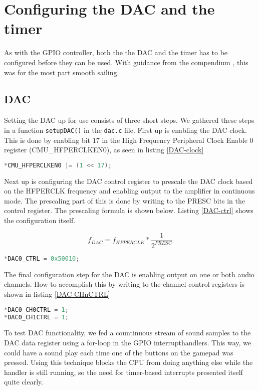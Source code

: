 \section{Configuring the DAC and the timer}

As with the GPIO controller, both the the DAC and the timer has to be configured before they can be used. With guidance from the compendium \cite{compendium}, this was for the most part smooth sailing.

\subsection{DAC}

Setting the DAC up for use consists of three short steps. We gathered these steps in a function \texttt{setupDAC()} in the \texttt{dac.c} file. First up is enabling the DAC clock. This is done by enabling bit $17$ in the High Frequency Peripheral Clock Enable 0 register (CMU\_HFPERCLKEN0), as seen in listing \ref{DAC-clock}

\begin{lstlisting}[language=C, label=DAC-clock, caption=Enabling DAC clock]
*CMU_HFPERCLKEN0 |= (1 << 17);
\end{lstlisting}

Next up is configuring the DAC control register to prescale the DAC clock based on the HFPERCLK frequency and enabling output to the amplifier in continuous mode. The prescaling part of this is done by writing to the PRESC bits in the control register. The prescaling formula is shown below. Listing \ref{DAC-ctrl} shows the configuration itself.

\[f_{DAC} = f_{HFPERCLK} * \frac{1}{2^{PRESC}}\]

\begin{lstlisting}[language=C, label=DAC-ctrl, caption=Configuring]
*DAC0_CTRL = 0x50010;
\end{lstlisting}

The final configuration step for the DAC is enabling output on one or both audio channels. How to accomplish this by writing to the channel control registers is shown in listing \ref{DAC-CHnCTRL}

\begin{lstlisting}[language=C, label=DAC-CHnCTRL, caption=Enabling output to both audio channels]
*DAC0_CH0CTRL = 1;
*DAC0_CH1CTRL = 1;
\end{lstlisting}

To test DAC functionality, we fed a countinuous stream of sound samples to the DAC data register using a for-loop in the GPIO interrupthandlers. This way, we could have a sound play each time one of the buttons on the gamepad was pressed. Using this technique blocks the CPU from doing anything else while the handler is still running, so the need for timer-based interrupts presented itself quite clearly.

